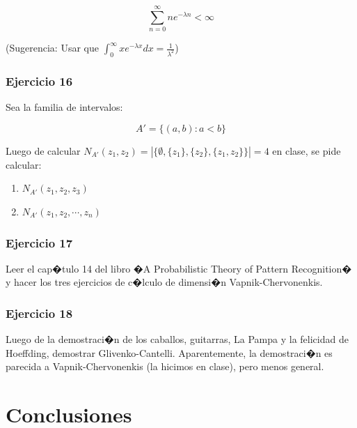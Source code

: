 \documentclass[a4paper,10pt]{article}
\begin{document}
	$$ \sum_{n=0}^{\infty} n e^{-\lambda n} < \infty$$
	
	(Sugerencia: Usar que $\int_{0}^{\infty} xe^{-\lambda x}dx = \frac{1}{\lambda^2}$)
	

	\subsubsection{Ejercicio 16}
	
	Sea la familia de intervalos:
	
	$$ A' =\{ (a,b): a< b \} $$
	
	Luego de calcular $N_{A'}(z_1,z_2) = |\{\emptyset, \{z_1\},\{z_2\},\{z_1,z_2\}\}|= 4$ en clase, se pide calcular:
	
	\begin{enumerate}
		\item $N_{A'} (z_1,z_2,z_3)$
		
		\item $N_{A'} (z_1,z_2,\cdots, z_n)$
	\end{enumerate}
	
	\subsubsection{Ejercicio 17}
	Leer el cap�tulo 14 del libro �A Probabilistic Theory of Pattern Recognition� y hacer los tres ejercicios de c�lculo de dimensi�n Vapnik-Chervonenkis.
	
	
	\subsubsection{Ejercicio 18}
	Luego de la demostraci�n de los caballos, guitarras, La Pampa y la felicidad de Hoeffding, demostrar Glivenko-Cantelli. Aparentemente, la demostraci�n es parecida a Vapnik-Chervonenkis (la hicimos en clase), pero menos general.
	
	
	
	\section{Conclusiones}

	\begin{thebibliography}{99}
		\bibitem{}
	\end{thebibliography}
\end{document}
